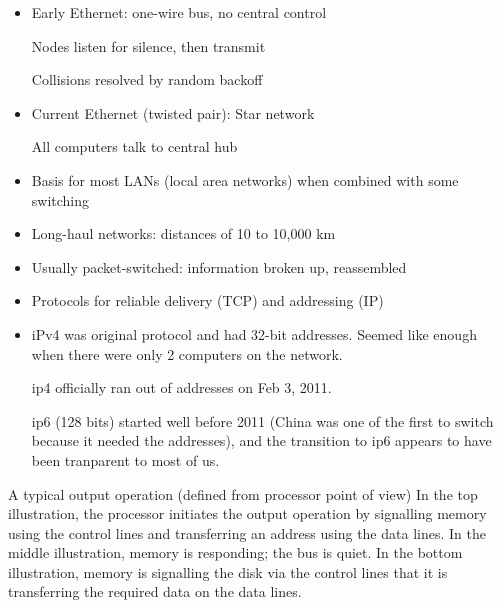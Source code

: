 \begin{frame}[fragile]
\begin{itemize}
\item Early Ethernet: one-wire bus,  no central control

Nodes listen for silence, then transmit

Collisions resolved by random backoff

\item Current Ethernet (twisted pair): Star network

	All computers talk to central hub
\item Basis for most LANs (local area networks) when combined with
some switching
\item Long-haul networks: distances of 10 to 10,000 km
\item Usually packet-switched: information broken up, reassembled
\item Protocols for reliable delivery (TCP) and addressing (IP)
\end{itemize}
\BNotes\ifnum{}
\begin{itemize}
	\item iPv4 was original protocol and had 32-bit addresses.  Seemed
		like enough when there were only 2 computers on the network.

		ip4 officially ran out of addresses on Feb 3, 2011.

		ip6 (128 bits) started well before 2011 (China was one of the first
		to switch because it needed the addresses), and the transition 
		to ip6 appears to have been tranparent to most of us.
\end{itemize}
\fi\ENotes
\end{frame}

\begin{frame}[fragile]

A typical output operation (defined from processor point of view)
\BNotes\ifnum{}
In the top illustration, the processor initiates the output operation
by signalling memory using the control lines and transferring an
address using the data lines. In the middle illustration, memory is
responding; the bus is quiet. In the bottom illustration, memory is
signalling the disk via the control lines that it is transferring the
required data on the data lines.
\fi\ENotes
\end{frame}

